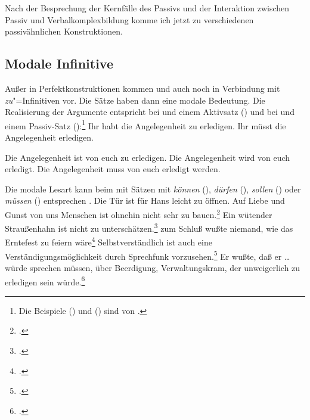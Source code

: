 Nach der Besprechung der Kernfälle des Passivs und der Interaktion zwischen Passiv und Verbalkomplexbildung
komme ich jetzt zu verschiedenen passivähnlichen Konstruktionen.

\subsection{Modale Infinitive}
\label{sec-modal-inf}


Außer%
%
in Perfektkonstruktionen kommen \haben und \sein auch noch in Verbindung mit \emph{zu}"=Infinitiven
vor. Die Sätze haben dann eine modale Bedeutung.
Die Realisierung der Argumente entspricht bei \zuinf und \haben einem Aktivsatz ()
und bei \zuinf und \sein einem Passiv-Satz ():\footnote{
        Die Beispiele () und () sind von \citet*[]{Bierwisch63a}.
}
\eal
\label{ex-habt-zu-erledigen}
\ex Ihr habt die Angelegenheit zu erledigen.
\ex Ihr müsst die Angelegenheit erledigen.
\zl

\eal
\label{ex-ist-zu-erledigen}
\ex Die Angelegenheit ist von euch zu erledigen.
\ex Die Angelegenheit wird von euch erledigt.
\ex Die Angelegenheit muss von euch erledigt werden.
\zl


\noindent
Die modale Lesart kann beim \zuinf mit \sein Sätzen mit
\emph{können} (), \emph{dürfen} (), \emph{sollen} ()
oder \emph{müssen} () entsprechen \citep[Kapitel~2]{Gelhaus77}.
\ea
Die Tür ist für Hans leicht zu öffnen.
\z
\eal
\ex Auf Liebe und Gunst von uns Menschen ist ohnehin nicht sehr zu bauen.\footnote{
        .
}
\ex Ein wütender Straußenhahn ist nicht zu unterschätzen.\footnote{
        .%
}
\zl
\ea
zum Schluß wußte niemand, wie das Erntefest zu feiern wäre\footnote{
        .
}
\z
\eal
\ex Selbstverständlich ist auch eine Verständigungsmöglichkeit durch Sprechfunk vorzusehen.\footnote{
        .
}
\ex Er wußte, daß er \ldots{} würde sprechen müssen, über Beerdigung, Verwaltungskram, der unweigerlich
    zu erledigen sein würde.\footnote{
        .
}

